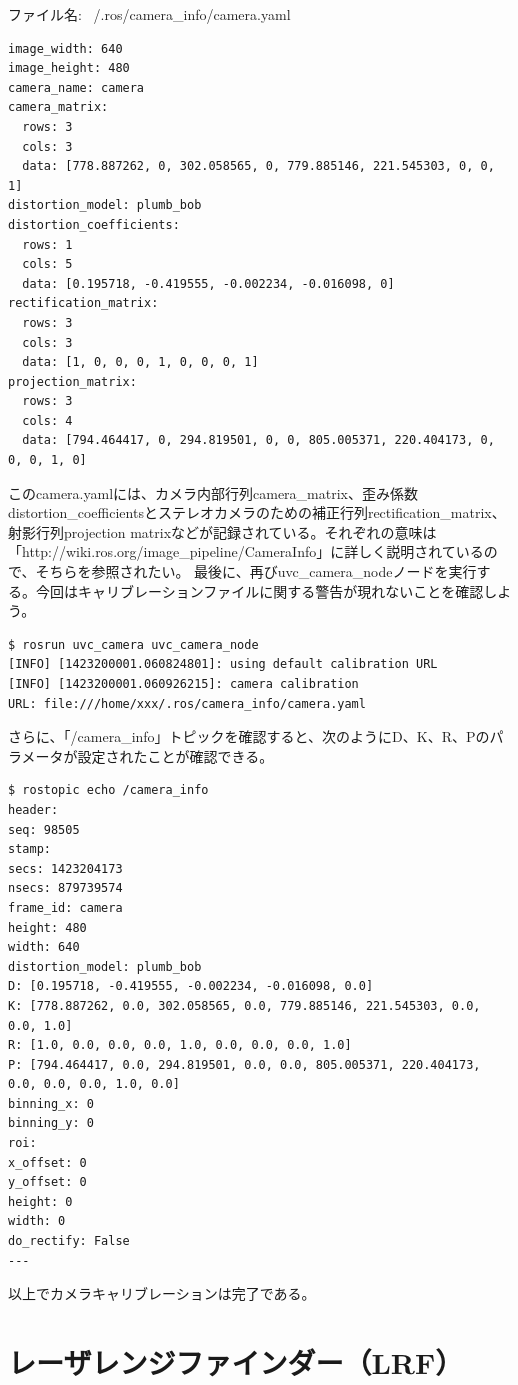 ファイル名: ~/.ros/camera\_info/camera.yaml
\begin{lstlisting}[language=ROS]
image_width: 640
image_height: 480
camera_name: camera
camera_matrix:
  rows: 3
  cols: 3
  data: [778.887262, 0, 302.058565, 0, 779.885146, 221.545303, 0, 0, 1]
distortion_model: plumb_bob
distortion_coefficients:
  rows: 1
  cols: 5
  data: [0.195718, -0.419555, -0.002234, -0.016098, 0]
rectification_matrix:
  rows: 3
  cols: 3
  data: [1, 0, 0, 0, 1, 0, 0, 0, 1]
projection_matrix:
  rows: 3
  cols: 4
  data: [794.464417, 0, 294.819501, 0, 0, 805.005371, 220.404173, 0, 0, 0, 1, 0]
\end{lstlisting}

このcamera.yamlには、カメラ内部行列camera\_matrix、歪み係数distortion\_coefficientsとステレオカメラのための補正行列rectification\_matrix、射影行列projection matrixなどが記録されている。それぞれの意味は「http://wiki.ros.org/image\_pipeline/CameraInfo」に詳しく説明されているので、そちらを参照されたい。
最後に、再びuvc\_camera\_nodeノードを実行する。今回はキャリブレーションファイルに関する警告が現れないことを確認しよう。

\begin{lstlisting}[language=ROS]
$ rosrun uvc_camera uvc_camera_node
[INFO] [1423200001.060824801]: using default calibration URL
[INFO] [1423200001.060926215]: camera calibration
URL: file:///home/xxx/.ros/camera_info/camera.yaml
\end{lstlisting}

さらに、「/camera\_info」トピックを確認すると、次のようにD、K、R、Pのパラメータが設定されたことが確認できる。

\begin{lstlisting}[language=ROS]
$ rostopic echo /camera_info
header:
seq: 98505
stamp:
secs: 1423204173
nsecs: 879739574
frame_id: camera
height: 480
width: 640
distortion_model: plumb_bob
D: [0.195718, -0.419555, -0.002234, -0.016098, 0.0]
K: [778.887262, 0.0, 302.058565, 0.0, 779.885146, 221.545303, 0.0, 0.0, 1.0]
R: [1.0, 0.0, 0.0, 0.0, 1.0, 0.0, 0.0, 0.0, 1.0]
P: [794.464417, 0.0, 294.819501, 0.0, 0.0, 805.005371, 220.404173, 0.0, 0.0, 0.0, 1.0, 0.0]
binning_x: 0
binning_y: 0
roi:
x_offset: 0
y_offset: 0
height: 0
width: 0
do_rectify: False
---
\end{lstlisting}

以上でカメラキャリブレーションは完了である。

\section{レーザレンジファインダー（LRF）}

